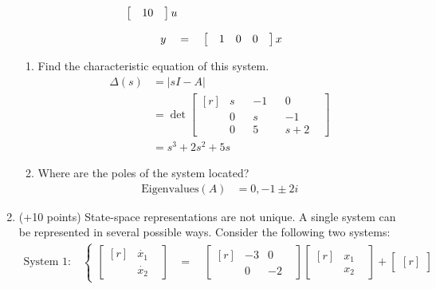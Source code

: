 \documentclass[11pt]{article}
\begin{document}
\begin{enumerate}
\begin{align}
\begin{bmatrix*}
            &10&
            \end{bmatrix*}
            u\\[0.75em]\notag
        y\quad&=\quad
        \begin{bmatrix}
            &1 & 0 & 0&\\
        \end{bmatrix}
        x
    \end{align}
    \begin{enumerate}
        \item Find the characteristic equation of this system.
        \begin{align*}
            \Delta(s)&=|sI-A|\\
            &=
            \det \begin{bmatrix*}[r]
                &s &&-1 &&0&\\
                &0 &&s &&-1&\\
                &0 &&5 &&s+2&
            \end{bmatrix*}\\
            &=s^3+2s^2+5s
        \end{align*}
        \item Where are the poles of the system located?
        \begin{align*}
            \text{Eigenvalues}(A)&=0,-1\pm 2i
        \end{align*}
    \end{enumerate}
    \item (+10 points) State-space representations are not unique. A single system can be represented in several possible ways. Consider the following two systems:
    \begin{align*}
        \text{System 1:}\quad
        \begin{cases}
            \begin{bmatrix*}[r]
                &\dot{x_1}&\\
                &\dot{x_2}&
            \end{bmatrix*}
            &=\quad
            \begin{bmatrix*}[r]
                &-3 & 0&\\
                &0 & -2&
            \end{bmatrix*}
            \begin{bmatrix*}[r]
                &x_1&\\
                &x_2&
            \end{bmatrix*}+
            \begin{bmatrix*}[r]

\end{bmatrix*}
\end{cases}
\end{align*}
\end{enumerate}
\end{document}
